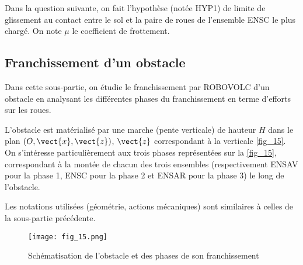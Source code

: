 

Dans la question suivante, on fait l'hypothèse (notée HYP1) de limite de glissement au contact
entre le sol et la paire de roues de l'ensemble ENSC le plus chargé. On note $\mu$ le coefficient
de frottement.


\subsection{Franchissement d'un obstacle}

\begin{obj}
Dans cette sous-partie, on étudie le franchissement par ROBOVOLC d'un obstacle en
analysant les différentes phases du franchissement en terme d'efforts sur les roues.
\end{obj}

L'obstacle est matérialisé par une marche (pente verticale) de hauteur $H$ dans le plan $\left(O,\vect{x},\vect{z}\right)$,
$\vect{z}$ correspondant à la verticale \autoref{fig_15}.
On s'intéresse particulièrement aux trois phases représentées sur la \autoref{fig_15}, correspondant à la
montée de chacun des trois ensembles (respectivement ENSAV pour la phase 1, ENSC pour la
phase 2 et ENSAR pour la phase 3) le long de l'obstacle.

Les notations utilisées (géométrie, actions mécaniques) sont similaires à celles de la sous-partie
précédente.

\begin{figure}[H]
\centering
\texttt{[image: fig\_15.png]}
\caption{Schématisation de l'obstacle et des phases de son franchissement\label{fig_15}}
\end{figure}


